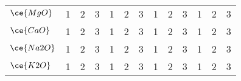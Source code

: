 \begin{table*}[]
{\begin{tabular}{l|ccc|ccc|ccc|ccc}
$\ce{MgO}$   & \multicolumn{1}{c}{1}     & \multicolumn{1}{c}{2}      & \multicolumn{1}{c|}{3}     & \multicolumn{1}{c}{1}     & \multicolumn{1}{c}{2}      & \multicolumn{1}{c|}{3}     & \multicolumn{1}{c}{1}     & \multicolumn{1}{c}{2}      & \multicolumn{1}{c|}{3}     & \multicolumn{1}{c}{1}     & \multicolumn{1}{c}{2}      & 3                          \\
$\ce{CaO}$   & \multicolumn{1}{c}{1}     & \multicolumn{1}{c}{2}      & \multicolumn{1}{c|}{3}     & \multicolumn{1}{c}{1}     & \multicolumn{1}{c}{2}      & \multicolumn{1}{c|}{3}     & \multicolumn{1}{c}{1}     & \multicolumn{1}{c}{2}      & \multicolumn{1}{c|}{3}     & \multicolumn{1}{c}{1}     & \multicolumn{1}{c}{2}      & 3                          \\
$\ce{Na2O}$  & \multicolumn{1}{c}{1}     & \multicolumn{1}{c}{2}      & \multicolumn{1}{c|}{3}     & \multicolumn{1}{c}{1}     & \multicolumn{1}{c}{2}      & \multicolumn{1}{c|}{3}     & \multicolumn{1}{c}{1}     & \multicolumn{1}{c}{2}      & \multicolumn{1}{c|}{3}     & \multicolumn{1}{c}{1}     & \multicolumn{1}{c}{2}      & 3                          \\
$\ce{K2O}$   & \multicolumn{1}{c}{1}     & \multicolumn{1}{c}{2}      & \multicolumn{1}{c|}{3}     & \multicolumn{1}{c}{1}     & \multicolumn{1}{c}{2}      & \multicolumn{1}{c|}{3}     & \multicolumn{1}{c}{1}     & \multicolumn{1}{c}{2}      & \multicolumn{1}{c|}{3}     & \multicolumn{1}{c}{1}     & \multicolumn{1}{c}{2}      & 3                          \\
\hline
\end{tabular}%
}
\end{table*}
